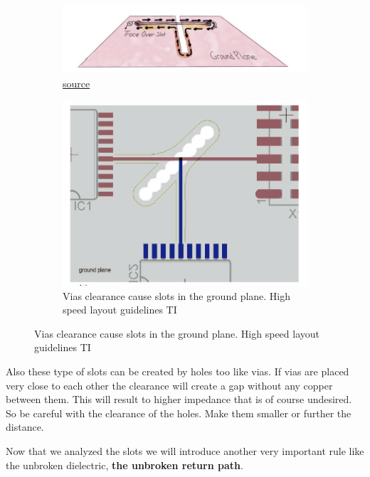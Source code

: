\documentclass[final]{cubedoc}
\begin{document}
	\begin{figure}[h!]
		\centering
		\begin{subfigure}{.5\textwidth}
			\centering
			\includegraphics[keepaspectratio, width=\textwidth]{assets/slot.png}
			\caption{\href{https://www.tempoautomation.com/blog/design-to-avoid-emi-problems-keep-clocks-away-from-unintended-antennas/}{source}}
		\end{subfigure}%
		\begin{subfigure}{.5\textwidth}
			\centering	
			\includegraphics[width=\textwidth]{assets/slot_via.png}
			\caption{Vias clearance cause slots in the ground plane. High speed layout guidelines TI}
		\end{subfigure}
	\end{figure}
	
	Also these type of slots can be created by holes too like vias. If vias are placed very close to each other the clearance will create a gap without any copper between them. This will result to higher impedance that is of course undesired. So be careful with the clearance of the holes. Make them smaller or further the distance.
	
	Now that we analyzed the slots we will introduce another very important rule like the unbroken dielectric, \textbf{the unbroken return path}.
	
\end{document}
